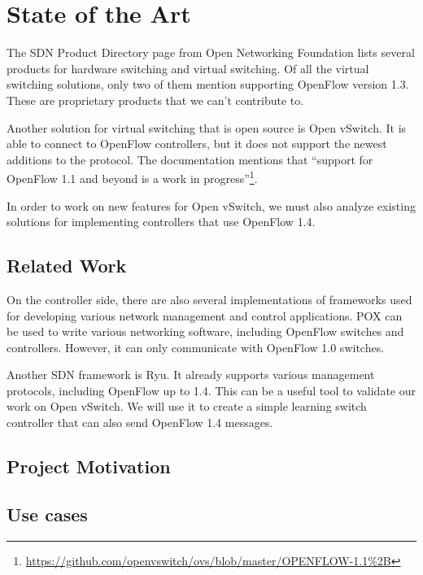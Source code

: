 \chapter{State of the Art}
\label{chapter:sota} 

The SDN Product Directory\cite{onf:products} page from Open Networking Foundation\cite{onf} lists
several products for hardware switching and virtual switching. Of all the virtual switching solutions,
only two of them mention supporting OpenFlow version 1.3. These are proprietary products that
we can't contribute to.

Another solution for virtual switching that is open source is Open vSwitch. It is able to connect to OpenFlow controllers,
but it does not support the newest additions to the protocol. The documentation mentions that 
``support for OpenFlow 1.1 and beyond is a work in progress''\footnote{\url{https://github.com/openvswitch/ovs/blob/master/OPENFLOW-1.1\%2B}}.
 
In order to work on new features for Open vSwitch, we must also analyze existing solutions for implementing controllers
that use OpenFlow 1.4.
 
\section{Related Work}


On the controller side, there are also several implementations of frameworks used for developing
various network management and control applications. POX\cite{pox} can be used to write various networking software,
including OpenFlow switches and controllers. However, it can only communicate with OpenFlow 1.0 switches.

Another SDN framework is Ryu\cite{ryu}. It already supports various management protocols, including OpenFlow up to 1.4.
This can be a useful tool to validate our work on Open vSwitch. We will use it to create a simple learning switch
controller that can also send OpenFlow 1.4 messages.

\section{Project Motivation}

\section{Use cases}

